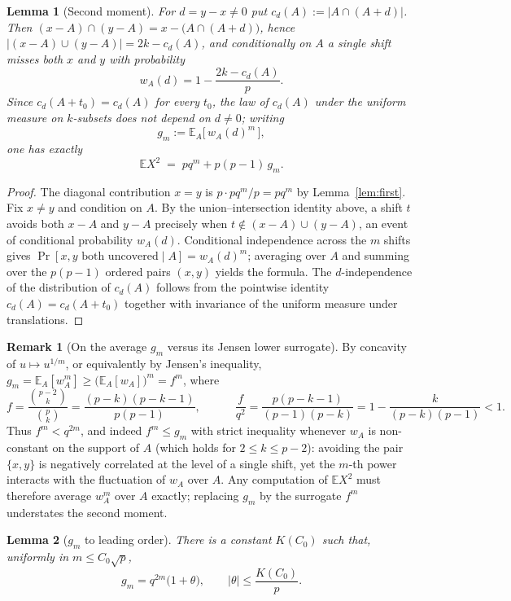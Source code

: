 \documentclass[11pt]{article}
\newtheorem{lemma}{Lemma}
\theoremstyle{definition}
\newtheorem{remark}{Remark}
\newcommand{\E}{\mathbb{E}}
\newcommand{\Prob}{\Pr}
\begin{document}
\begin{lemma}[Second moment]\label{lem:second}
For $d=y-x\ne0$ put $c_d(A):=|A\cap(A+d)|$. Then
$(x-A)\cap(y-A)=x-\bigl(A\cap(A+d)\bigr)$, hence
$|(x-A)\cup(y-A)|=2k-c_d(A)$, and conditionally on $A$ a single shift misses
both $x$ and $y$ with probability
\[
w_A(d)=1-\frac{2k-c_d(A)}{p}.
\]
Since $c_d(A+t_0)=c_d(A)$ for every $t_0$, the law of $c_d(A)$ under the
uniform measure on $k$-subsets does not depend on $d\ne0$; writing
\[
g_m:=\E_A\bigl[\,w_A(d)^m\,\bigr],
\]
one has exactly
\[
\E X^2 \;=\; pq^m + p(p-1)\,g_m .
\]
\end{lemma}

\begin{proof}
The diagonal contribution $x=y$ is $p\cdot pq^m/p=pq^m$ by Lemma~\ref{lem:first}.
Fix $x\ne y$ and condition on $A$. By the union--intersection identity above,
a shift $t$ avoids both $x-A$ and $y-A$ precisely when
$t\notin(x-A)\cup(y-A)$, an event of conditional probability $w_A(d)$.
Conditional independence across the $m$ shifts gives
$\Prob[x,y\text{ both uncovered}\mid A]=w_A(d)^m$; averaging over $A$ and
summing over the $p(p-1)$ ordered pairs $(x,y)$ yields the formula. The
$d$-independence of the distribution of $c_d(A)$ follows from the pointwise
identity $c_d(A)=c_d(A+t_0)$ together with invariance of the uniform measure
under translations.
\end{proof}

\begin{remark}[On the average $g_m$ versus its Jensen lower surrogate]\label{rem:jensen}
By concavity of $u\mapsto u^{1/m}$, or equivalently by Jensen's inequality,
$g_m=\E_A[w_A^m]\ge\bigl(\E_A[w_A]\bigr)^m=f^m$, where
\[
f=\frac{\binom{p-2}{k}}{\binom pk}=\frac{(p-k)(p-k-1)}{p(p-1)},
\qquad\quad
\frac{f}{q^{2}}=\frac{p(p-k-1)}{(p-1)(p-k)}
      =1-\frac{k}{(p-k)(p-1)}<1 .
\]
Thus $f^m<q^{2m}$, and indeed $f^m\le g_m$ with strict inequality whenever
$w_A$ is non-constant on the support of $A$ (which holds for $2\le k\le p-2$):
avoiding the pair $\{x,y\}$ is negatively correlated at the level of a single
shift, yet the $m$-th power interacts with the fluctuation of $w_A$ over $A$.
Any computation of $\E X^2$ must therefore average $w_A^m$ over $A$ exactly;
replacing $g_m$ by the surrogate $f^m$ understates the second moment.
\end{remark}

\begin{lemma}[$g_m$ to leading order]\label{lem:gm}
There is a constant $K(C_0)$ such that, uniformly in $m\le C_0\sqrt p$,
\[
g_m=q^{2m}\bigl(1+\theta\bigr),\qquad |\theta|\le \frac{K(C_0)}{p}.
\]
\end{lemma}
\end{document}
